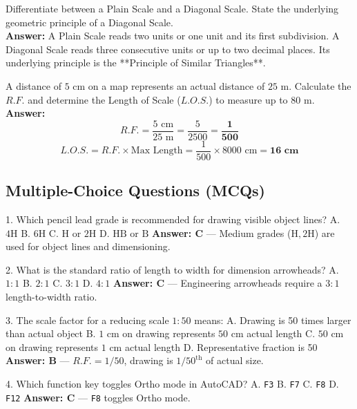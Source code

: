 \begin{vivaqa}
Differentiate between a Plain Scale and a Diagonal Scale. State the underlying geometric principle of a Diagonal Scale.\\[4pt]
\textbf{Answer:} A Plain Scale reads two units or one unit and its first subdivision. A Diagonal Scale reads three consecutive units or up to two decimal places. Its underlying principle is the **Principle of Similar Triangles**.
\end{vivaqa}

\begin{vivaqa}
A distance of $5\text{ cm}$ on a map represents an actual distance of $25\text{ m}$. Calculate the $R.F.$ and determine the Length of Scale ($L.O.S.$) to measure up to $80\text{ m}$.\\[4pt]
\textbf{Answer:}  
$$R.F. = \frac{5\text{ cm}}{25\text{ m}} = \frac{5}{2500} = \mathbf{\frac{1}{500}}$$
$$L.O.S. = R.F. \times \text{Max Length} = \frac{1}{500} \times 8000\text{ cm} = \mathbf{16\text{ cm}}$$
\end{vivaqa}

\subsection{Multiple-Choice Questions (MCQs)}

1. Which pencil lead grade is recommended for drawing visible object lines?  
   A. $4\text{H}$  
   B. $6\text{H}$  
   C. $\text{H}$ or $2\text{H}$  
   D. $\text{HB}$ or $\text{B}$  
   \textbf{Answer: C} — Medium grades ($\text{H}, 2\text{H}$) are used for object lines and dimensioning.

2. What is the standard ratio of length to width for dimension arrowheads?  
   A. $1:1$  
   B. $2:1$  
   C. $3:1$  
   D. $4:1$  
   \textbf{Answer: C} — Engineering arrowheads require a $3:1$ length-to-width ratio.

3. The scale factor for a reducing scale $1:50$ means:  
   A. Drawing is 50 times larger than actual object  
   B. $1\text{ cm}$ on drawing represents $50\text{ cm}$ actual length  
   C. $50\text{ cm}$ on drawing represents $1\text{ cm}$ actual length  
   D. Representative fraction is 50  
   \textbf{Answer: B} — $R.F. = 1/50$, drawing is $1/50^{\text{th}}$ of actual size.

4. Which function key toggles Ortho mode in AutoCAD?  
   A. \texttt{F3}  
   B. \texttt{F7}  
   C. \texttt{F8}  
   D. \texttt{F12}  
   \textbf{Answer: C} — \texttt{F8} toggles Ortho mode.

